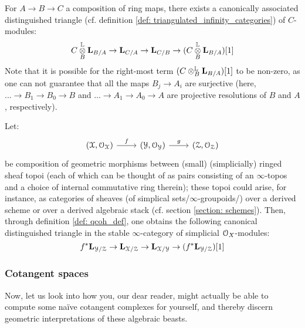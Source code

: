                 \begin{proposition} \label{prop: canonical_exact_sequence_of_cotangent_complexes}
                    For $A \to B \to C$ a composition of ring maps, there exists a canonically associated distinguished triangle (cf. definition \ref{def: triangulated_infinity_categories}) of $C$-modules:
                        $$C \tensor_B^{\L} \bfL_{B/A} \to \bfL_{C/A} \to \bfL_{C/B} \to (C \tensor_B^{\L} \bfL_{B/A})[1]$$
                    Note that it is possible for the right-most term $(C \tensor_B^{\L} \bfL_{B/A})[1]$ to be non-zero, as one can not guarantee that all the maps $B_j \to A_i$ are surjective (here, $... \to B_1 \to B_0 \to B$ and $... \to A_1 \to A_0 \to A$ are projective resolutions of $B$ and $A$, respectively). 
                \end{proposition}
                \begin{corollary} \label{coro: canonical_exact_sequence_of_cotangent_complexes_of_ringed_topoi}
                    Let:
                        $$
                            \begin{tikzcd}
                            	{(\calX, \calO_{\calX})} & {(\calY, \calO_{\calY})} & {(\calZ, \calO_{\calZ})}
                            	\arrow["f", from=1-1, to=1-2]
                            	\arrow["g", from=1-2, to=1-3]
                            \end{tikzcd}
                        $$
                    be composition of geometric morphisms between (small) (simplicially) ringed sheaf topoi (each of which can be thought of as pairs consisting of an $\infty$-topos and a choice of internal commutative ring therein); these topoi could arise, for instance, as categories of sheaves (of simplical sets/$\infty$-groupoids/) over a derived scheme or over a derived algebraic stack (cf. section \ref{section: schemes}). Then, through definition \ref{def: qcoh_def}, one obtains the following canonical distinguished triangle in the stable $\infty$-category of simplicial $\mathcal{O}_X$-modules:
                        $$f^*\mathbf{L}_{\mathcal{Y}/\mathcal{Z}} \to \mathbf{L}_{\mathcal{X}/\mathcal{Z}} \to \mathbf{L}_{\mathcal{X}/\mathcal{Y}} \to (f^*\mathbf{L}_{\mathcal{Y}/\mathcal{Z}})[1]$$
                \end{corollary}
                
            \subsubsection{Cotangent spaces} \label{subsubsection: cotangent_spaces}
                Now, let us look into how you, our dear reader, might actually be able to compute some na\"ive cotangent complexes for yourself, and thereby discern geometric interpretations of these algebraic beasts. 
                
